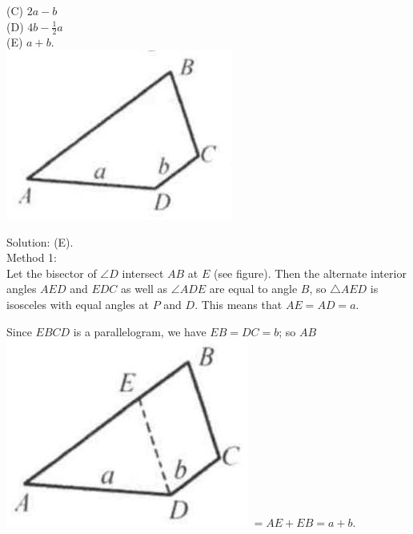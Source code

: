 \documentclass[10pt]{article}
\begin{document}
(C) \(2 a-b\)\\
(D) \(4 b-\frac{1}{2} a\)\\
(E) \(a+b\).\\
\includegraphics[max width=\textwidth, center]{2025_04_17_97bc1f7e44d93c271a88g-110(3)}

Solution: (E).\\
Method 1:\\
Let the bisector of \(\angle D\) intersect \(A B\) at \(E\) (see figure). Then the alternate interior angles \(A E D\) and \(E D C\) as well as \(\angle A D E\) are equal to angle \(B\), so \(\triangle A E D\) is isosceles with equal angles at \(P\) and \(D\). This means that \(A E=A D=a\).

Since \(E B C D\) is a parallelogram, we have \(E B=D C=b\); so \(A B\)\\
\includegraphics[max width=\textwidth]{2025_04_17_97bc1f7e44d93c271a88g-110(2)} \(=A E+E B=a+b\).
\end{document}
